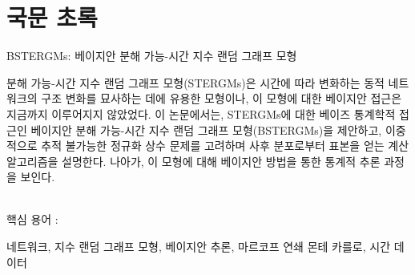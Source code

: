 \documentclass[a4paper, 11pt]{report}
\theoremstyle{definition}
\begin{document}






\nocite{*}





\newpage

\section*{국문 초록}
\par
\bigskip

\begin{center}
\large
BSTERGMs: 베이지안 분해 가능-시간 지수 랜덤 그래프 모형 
\end{center}
\par
\bigskip
\noindent
분해 가능-시간 지수 랜덤 그래프 모형(STERGMs)은 시간에 따라 변화하는
동적 네트워크의 구조 변화를 묘사하는 데에 유용한 모형이나,
이 모형에 대한 베이지안 접근은 지금까지 이루어지지 않았었다.
이 논문에서는, STERGMs에 대한 베이즈 통계학적 접근인 베이지안 분해 가능-시간 지수 랜덤 그래프 모형(BSTERGMs)을 제안하고,
이중적으로 추적 불가능한 정규화 상수 문제를 고려하며 사후 분포로부터 표본을 얻는
계산 알고리즘을 설명한다. 나아가, 이 모형에 대해 베이지안 방법을 통한 통계적 추론 과정을 보인다.


\bigskip
\noindent \hrulefill\\
핵심 용어 :  \par 네트워크, 지수 랜덤 그래프 모형, 베이지안 추론, 마르코프 연쇄 몬테 카를로, 시간 데이터


\newpage

\end{document}
